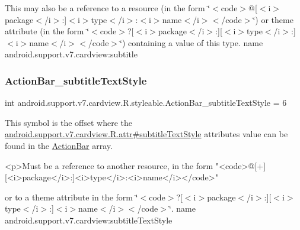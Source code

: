 This may also be a reference to a resource (in the form \char`\"{}$<$code$>$@\mbox{[}$<$i$>$package$<$/i$>$\+:\mbox{]}$<$i$>$type$<$/i$>$\+:$<$i$>$name$<$/i$>$$<$/code$>$\char`\"{}) or theme attribute (in the form \char`\"{}$<$code$>$?\mbox{[}$<$i$>$package$<$/i$>$\+:\mbox{]}\mbox{[}$<$i$>$type$<$/i$>$\+:\mbox{]}$<$i$>$name$<$/i$>$$<$/code$>$\char`\"{}) containing a value of this type.  name android.\+support.\+v7.\+cardview\+:subtitle \mbox{\label{classandroid_1_1support_1_1v7_1_1cardview_1_1R_1_1styleable_a6d8d0a0581b055a9ecd79f72356a2363}} 
\subsubsection{\texorpdfstring{Action\+Bar\+\_\+subtitle\+Text\+Style}{ActionBar\_subtitleTextStyle}}
{\footnotesize\ttfamily int android.\+support.\+v7.\+cardview.\+R.\+styleable.\+Action\+Bar\+\_\+subtitle\+Text\+Style = 6\hspace{0.3cm}{\ttfamily [static]}}

This symbol is the offset where the \hyperlink{classandroid_1_1support_1_1v7_1_1cardview_1_1R_1_1attr_ab76882e8855338c32b6fe8ee7b986537}{android.\+support.\+v7.\+cardview.\+R.\+attr\#subtitle\+Text\+Style} attribute\textquotesingle{}s value can be found in the \hyperlink{classandroid_1_1support_1_1v7_1_1cardview_1_1R_1_1styleable_a0cbf7f776e31f78bb0a2b558daf176f8}{Action\+Bar} array.

\begin{DoxyVerb}      <p>Must be a reference to another resource, in the form "<code>@[+][<i>package</i>:]<i>type</i>:<i>name</i></code>"
\end{DoxyVerb}
 or to a theme attribute in the form \char`\"{}$<$code$>$?\mbox{[}$<$i$>$package$<$/i$>$\+:\mbox{]}\mbox{[}$<$i$>$type$<$/i$>$\+:\mbox{]}$<$i$>$name$<$/i$>$$<$/code$>$\char`\"{}.  name android.\+support.\+v7.\+cardview\+:subtitle\+Text\+Style \mbox{\label{classandroid_1_1support_1_1v7_1_1cardview_1_1R_1_1styleable_a9f462e0d5b1136610c581eb739fecd82}} 
